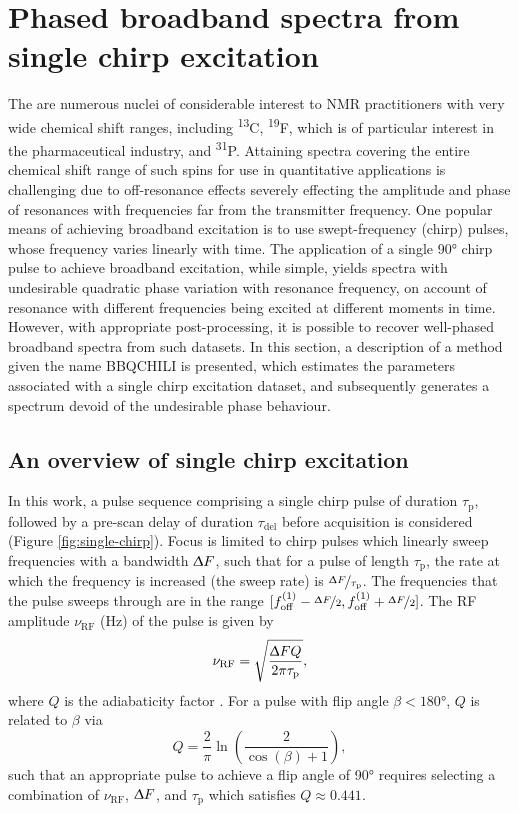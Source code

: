 \section{Phased broadband spectra from single chirp excitation}
\label{sec:bbqchili}

The are numerous nuclei of considerable interest to \ac{NMR} practitioners with
very wide chemical shift ranges, including \textsuperscript{13}C,
\textsuperscript{19}F, which is of particular interest in the pharmaceutical
industry, and \textsuperscript{31}P. Attaining spectra covering the entire
chemical shift range of such spins for use in quantitative applications is
challenging due to off-resonance effects severely effecting the amplitude and
phase of resonances with frequencies far from the transmitter
frequency\cite[Section 3.4.1]{Cavanagh2007}. One popular means of achieving
broadband excitation is to use swept-frequency (chirp)
pulses\cite{Bohlen1989,Bohlen1993}, whose frequency varies linearly with time.
The application of a single \ang{90} chirp pulse to achieve broadband
excitation, while simple, yields spectra with undesirable quadratic phase
variation with resonance frequency, on account of resonance with different
frequencies being excited at different moments in time. However, with
appropriate post-processing, it is possible to recover well-phased broadband
spectra from such datasets. In this section, a description of a method given
the name \ac{BBQCHILI} is presented, which estimates the parameters associated
with a single chirp excitation dataset, and subsequently generates a spectrum
devoid of the undesirable phase behaviour.

\subsection{An overview of single chirp excitation}
In this work, a pulse sequence comprising a single chirp pulse of duration
$\tau_{\text{p}}$, followed by a pre-scan delay of duration $\tau_{\text{del}}$
before acquisition is considered (Figure \ref{fig:single-chirp}).
Focus is limited to chirp pulses which linearly sweep frequencies
with a bandwidth $\Updelta F$, such that for a pulse of length
$\tau_{\text{p}}$, the rate at which the frequency is increased (the sweep
rate) is $\nicefrac{\Updelta F}{\tau_{\text{p}}}$. The frequencies that the
pulse sweeps through are in the range $[f_{\mathrm{off}}^{(1)} - \nicefrac{\Updelta F}{2},
f_{\mathrm{off}}^{(1)} + \nicefrac{\Updelta F}{2}]$. The \ac{RF} amplitude $\nu_{\text{RF}}$
(\unit{\hertz}) of the pulse is given by
\begin{equation}
    \nu_{\text{RF}} = \sqrt{
        \frac{\Updelta F Q}{2 \pi \tau_{\text{p}}}
    },
\end{equation}
where $Q$ is the adiabaticity factor . For a pulse
with flip angle  $\beta < \ang{180}$,  $Q$ is related to $\beta$ via
\begin{equation}
    Q = \frac{2}{\pi} \ln \left( \frac{2}{\cos(\beta) + 1} \right),
\end{equation}
such that an appropriate pulse to achieve a flip angle of \ang{90} requires
selecting a combination of $\nu_{\text{RF}}$, $\Updelta F$, and
$\tau_{\text{p}}$ which satisfies $Q \approx 0.441$.


